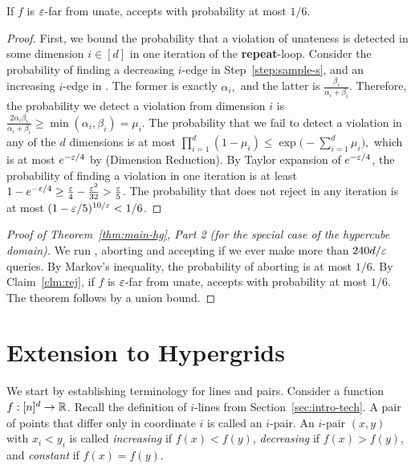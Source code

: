 \begin{claim} \label{clm:rej}
If $f$ is $\varepsilon$-far from unate,  accepts with probability at most $1/6$.
\end{claim}

\begin{proof}
First, we bound the probability that a violation of unateness is detected in some dimension $i \in [d]$ in one iteration of the {\bf repeat}-loop.
Consider the probability of finding a %
decreasing $i$-edge in Step~\ref{step:sample-s}, and an %
increasing $i$-edge in .
	The former is exactly $\alpha_i,$ and the latter is $\frac{\beta_i}{\alpha_i+\beta_i}$. Therefore, the probability we detect a violation from dimension $i$ is
$\frac{2 \alpha_i \beta_i}{\alpha_i+\beta_i} \geq \min(\alpha_i,\beta_i) = \mu_i$.
The probability that we fail to detect a violation in any of the $d$ dimensions is at most $\prod_{i =1}^d (1-\mu_i) \leq \exp\big(-\sum_{i = 1}^d \mu_i\big),$ which is at most $e^{-\varepsilon/4}$ by  (Dimension Reduction). By Taylor expansion of $e^{-\varepsilon/4}$, the probability of finding a violation in one iteration is at least $1-e^{-\varepsilon/4} \geq
\frac{\varepsilon}{4} - \frac{\varepsilon^2}{32} >
\frac{\varepsilon}{5}$. %
The probability that  does not reject in any iteration is at most $(1-\varepsilon/5)^{10/\varepsilon} < 1/6$.
\end{proof}

\begin{proof}[{Proof of Theorem~\ref{thm:main-hg}, Part 2} (for the special case of the hypercube domain)]
We run , aborting and accepting if we ever make more than $240d/\varepsilon$ queries. By Markov's inequality, the probability of aborting is at most $1/6$.
By Claim~\ref{clm:rej}, if $f$ is $\varepsilon$-far from unate,  accepts with probability at most $1/6$. The theorem follows by a union bound.
\end{proof}

\section{Extension to Hypergrids}\label{sec:hypergrids}
We start by establishing terminology for lines and pairs.
Consider a function $f:[n]^d\to{\mathbb R}$.
Recall the definition of $i$-lines from Section~\ref{sec:intro-tech}.
A pair of points that differ only in coordinate $i$ is called an $i$-pair.
An $i$-pair $(x,y)$ with $x_i < y_i$ is called {\em increasing} if $f(x) < f(y)$, {\em decreasing} if $f(x) > f(y),$ and {\em constant} if $f(x) = f(y)$.

